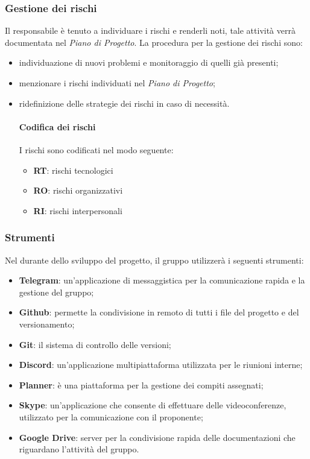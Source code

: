 \subsubsection{Gestione dei rischi}
Il responsabile è tenuto a individuare i rischi e renderli noti, tale attività verrà documentata nel \textit{Piano di Progetto}. La procedura per la gestione dei rischi sono: 
\begin{itemize}
\item individuazione di nuovi problemi e monitoraggio di quelli già presenti;
\item menzionare i rischi individuati nel \textit{Piano di Progetto}; 
\item ridefinizione delle strategie dei rischi in caso di necessità.

\paragraph{Codifica dei rischi} 
I rischi sono codificati nel modo seguente: 
\begin{itemize}
\item  \textbf{RT}: rischi tecnologici 
\item \textbf{RO}: rischi organizzativi
\item   \textbf{RI}: rischi interpersonali
\end{itemize}
\end{itemize}
\subsubsection{Strumenti}
Nel durante dello sviluppo del progetto, il gruppo utilizzerà i seguenti strumenti: 
\begin{itemize}
\item \textbf{Telegram\glo}: un'applicazione di messaggistica per la comunicazione rapida e la gestione del gruppo; 
\item \textbf{Github\glo}: permette la condivisione in remoto di tutti i file del progetto e del versionamento;
\item \textbf{Git\glo}: il sistema di controllo delle versioni;
\item \textbf{Discord}: un'applicazione multipiattaforma utilizzata per le riunioni interne;
\item \textbf{Planner}: è una piattaforma per la gestione dei compiti assegnati;
\item \textbf{Skype}: un'applicazione che consente di effettuare delle videoconferenze, utilizzato per la comunicazione con il proponente;
\item \textbf{Google Drive}: server per la condivisione rapida delle documentazioni che riguardano l'attività del gruppo.
\end{itemize}
